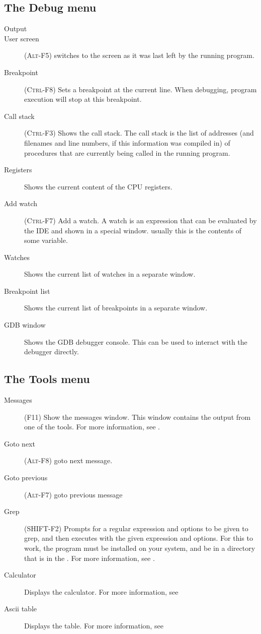 \subsection{The Debug menu}
\label{se:menudebug}
\begin{description}
\item[Output]
\item[User screen] (\textsc{Alt-F5}) switches to the screen as it was last
left by the running program.
\item[Breakpoint] (\textsc{Ctrl-F8})
Sets a breakpoint at the current line. When debugging, program execution
will stop at this breakpoint.
\item[Call stack] (\textsc{Ctrl-F3})
Shows the call stack. The call stack is the list of addresses (and
filenames and line numbers, if this information was compiled in) of 
procedures that are currently being called in the running program.
\item[Registers]
Shows the current content of the CPU registers. 
\item[Add watch] (\textsc{Ctrl-F7}) Add a watch. A watch is an expression
that can be evaluated by the IDE and shown in a special window. usually this
is the contents of some variable. 
\item[Watches]
Shows the current list of watches in a separate window.
\item[Breakpoint list]
Shows the current list of breakpoints in a separate window.
\item[GDB window]
Shows the GDB debugger console. This can be used to interact with the debugger
directly.
\end{description}
%
%
\subsection{The Tools menu}
\label{se:menutools}
\begin{description}
\item[Messages] (\textsc{F11}) Show the messages window. 
This window contains the output from one of the tools. For more information,
see .
\item[Goto next] (\textsc{Alt-F8}) goto next message.
\item[Goto previous] (\textsc{Alt-F7}) goto previous message
\item[Grep] (\textsc{SHIFT-F2}) Prompts for a regular expression and options
to be given to grep, and then executes  with the given expression and
options. For this to work, the  program must be installed on your
system, and be in a directory that is in the . For more
information, see .
\item[Calculator] 
Displays the calculator. For more information, see 
\item[Ascii table] Displays the  table. For more information, see
\end{description}
%
%
